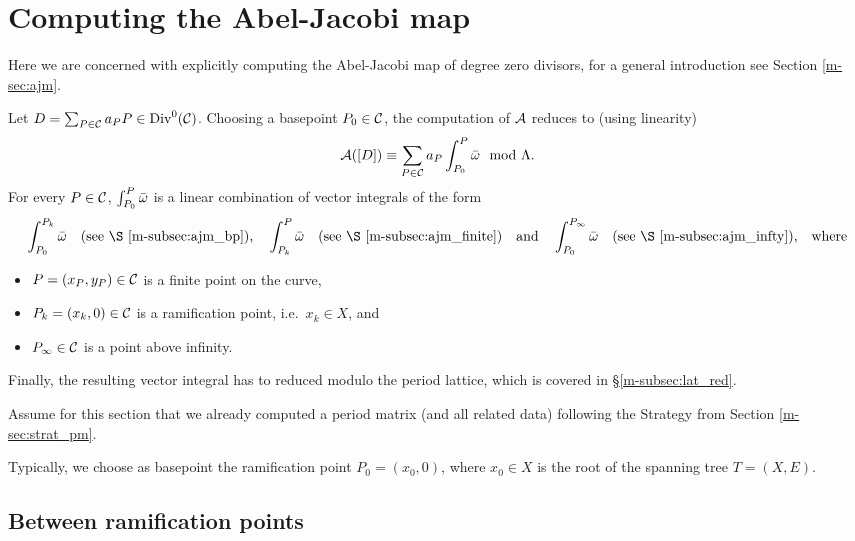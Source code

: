 \documentclass[main.tex]{subfiles}
\begin{document}
  \section{Computing the Abel-Jacobi map}\label{sec:comp_ajm}
  
   Here we are concerned with explicitly computing the Abel-Jacobi map of degree zero divisors, for a general introduction see Section \ref{m-sec:ajm}.
   
   Let $D = \sum_{P \in \mathcal{C}} a_P P \in \operatorname{Div}^0(\mathcal{C})$. Choosing a basepoint $P_0 \in \mathcal{C}$, the computation of $\mathcal{A}$ reduces to (using linearity)
   \begin{equation}
     \mathcal{A}([D]) \equiv \sum_{P \in \mathcal{C}} a_P \int_{P_0}^P \bar{\omega} \mod \Lambda.
   \end{equation}
  For every $P \in \mathcal{C}$, $\int_{P_0}^P \bar{\omega}$ is a linear combination of vector integrals of the form
  \begin{align*}
    \int_{P_0}^{P_k} \bar\w\quad \text{(see \S \ref{m-subsec:ajm_bp}),} \quad
    \int_{P_k}^{P} \bar\w \quad \text{(see \S \ref{m-subsec:ajm_finite})}
    \quad \text{and} \quad \int_{P_0}^{P_{\infty}} \bar\w\quad \text{(see \S \ref{m-subsec:ajm_infty}),} \quad \text{where}
  \end{align*}
  \begin{itemize}
   \item $P = (x_P,y_P) \in \mathcal{C}$ is a finite point on the curve,
   \item $P_k = (x_k,0) \in \mathcal{C}$ is a ramification point, i.e.\ $x_k \in X$, and
   \item $P_{\infty} \in \mathcal{C}$ is a point above infinity.
  \end{itemize}
  Finally, the resulting vector integral has to reduced modulo the period lattice, which is covered in \S \ref{m-subsec:lat_red}.
  
  Assume for this section that we already computed a period matrix (and all related data) following the Strategy from Section \ref{m-sec:strat_pm}. 
  
  Typically, we choose as basepoint the ramification point $P_0 = (x_0,0)$, where $x_0 \in X$ is the root of the spanning tree $T = (X,E)$.

  
   
  \subsection{Between ramification points}\label{subsec:ajm_bp}
\end{document}
